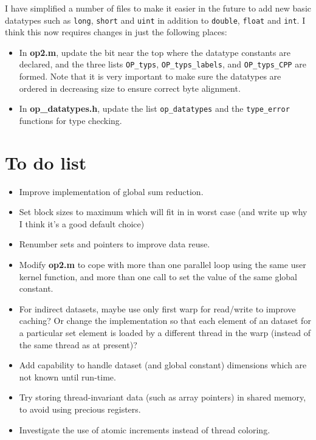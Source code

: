 \documentclass[12pt]{article}
\begin{document}
I have simplified a number of files to make it easier in the future to
add new basic datatypes such as {\tt long}, {\tt short} and {\tt uint}
in addition to {\tt double}, {\tt float} and {\tt int}.
I think this now requires changes in just the following places:
\begin{itemize}
\item
In {\bf op2.m}, update the bit near the top where the datatype constants 
are declared, and the three lists {\tt OP\_typs}, {\tt OP\_typs\_labels},
and {\tt OP\_typs\_CPP} are formed.  Note that it is very important to 
make sure the datatypes are ordered in decreasing size to ensure correct
byte alignment.

\item
In {\bf op\_datatypes.h}, update the list {\tt op\_datatypes} and the 
{\tt type\_error} functions for type checking.
\end{itemize}


\newpage

\section{To do list}

\begin{itemize}
\item
Improve implementation of global sum reduction.

\item
Set block sizes to maximum which will fit in in worst case
(and write up why I think it's a good default choice)

\item
Renumber sets and pointers to improve data reuse.

\item
Modify {\bf op2.m} to cope with more than one parallel loop using 
the same user kernel function, and more than one call to set the 
value of the same global constant.

\item
For indirect datasets, maybe use only first warp for read/write to 
improve caching?  Or change the implementation so that each element 
of an dataset for a particular set element is loaded by a different 
thread in the warp (instead of the same thread as at present)?

\item
Add capability to handle dataset (and global constant) dimensions 
which are not known until run-time.

\item
Try storing thread-invariant data (such as array pointers)
in shared memory, to avoid using precious registers.

\item
Investigate the use of atomic increments instead of thread coloring.
\end{itemize}
\end{document}
